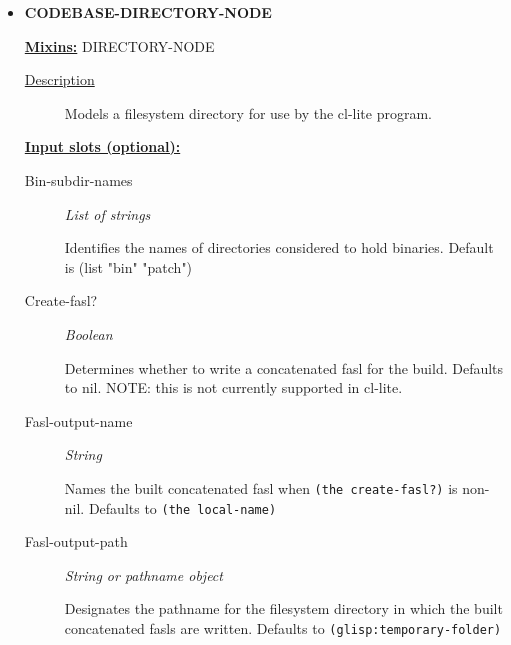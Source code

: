 \documentclass [11pt]{book}
\begin{document}
\begin{itemize}

\item {}
\textbf{CODEBASE-DIRECTORY-NODE}


\textbf{
\underline{Mixins:}} DIRECTORY-NODE





\begin{description}

\item [
\underline{Description}]


Models a filesystem directory for use by the cl-lite program.



\end{description}








\textbf{
\underline{Input slots (optional):}}

\begin{description}

\item [Bin-subdir-names]
\emph{List of strings}

 Identifies the names of directories considered to hold binaries.
Default is (list "bin" "patch")




\item [Create-fasl?]
\emph{Boolean}

 Determines whether to write a concatenated fasl for the build. Defaults to nil.
NOTE: this is not currently supported in cl-lite.




\item [Fasl-output-name]
\emph{String}

 Names the built concatenated fasl when \texttt{(the create-fasl?)} is non-nil.
Defaults to \texttt{(the local-name)}




\item [Fasl-output-path]
\emph{String or pathname object}

 Designates the pathname for the filesystem directory in which
the built concatenated fasls are written. Defaults to \texttt{(glisp:temporary-folder)}





\end{description}
\end{itemize}
\end{document}
